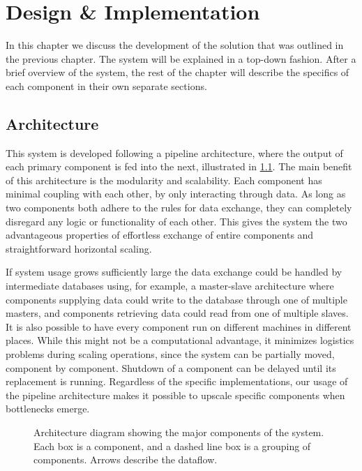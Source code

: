\chapter{Design \& Implementation}\label{chap:design}
In this chapter we discuss the development of the solution that was outlined in the previous chapter. The system will be explained in a top-down fashion. After a brief overview of the system, the rest of the chapter will describe the specifics of each component in their own separate sections.

\section{Architecture}\label{sec:design_overview}
This system is developed following a pipeline architecture, where the output of each primary component is fed into the next, illustrated in \cref{fig:system-overview}. The main benefit of this architecture is the modularity and scalability. Each component has minimal coupling with each other, by only interacting through data. As long as two components both adhere to the rules for data exchange, they can completely disregard any logic or functionality of each other. This gives the system the two advantageous properties of effortless exchange of entire components and straightforward horizontal scaling.

If system usage grows sufficiently large the data exchange could be handled by intermediate databases using, for example, a master-slave architecture where components supplying data could write to the database through one of multiple masters, and components retrieving data could read from one of multiple slaves. It is also possible to have every component run on different machines in different places. While this might not be a computational advantage, it minimizes logistics problems during scaling operations, since the system can be partially moved, component by component. Shutdown of a component can be delayed until its replacement is running. Regardless of the specific implementations, our usage of the pipeline architecture makes it possible to upscale specific components when bottlenecks emerge.

\begin{figure}[tb]%
  \centering
  
\caption[Architecture diagram showing the major components of the system]{Architecture diagram showing the major components of the system. Each box is a component, and a dashed line box is a grouping of components. Arrows describe the dataflow.}%
\label{fig:system-overview}%
\end{figure}

